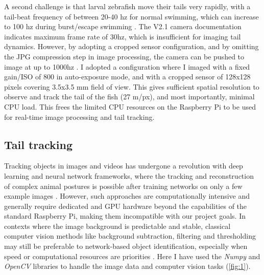 \documentclass[9pt,lineno]{RandlettLab_elife}
\begin{document}
A second challenge is that larval zebrafish move their tails very rapidly, with a tail-beat frequency of between 20-40 hz for normal swimming, which can increase to 100 hz during burst/escape swimming \citep{Budick2000-bq, Muller2004-st, Severi2014-iw}. The V2.1 camera documentation indicates maximum frame rate of 30hz, which is insufficient for imaging tail dynamics. However, by adopting a cropped sensor configuration, and by omitting the JPG compression step in image processing, the camera can be pushed to image at up to 1000hz \citep{660hz}. I adopted a configuration where I imaged with a fixed gain/ISO of 800 in auto-exposure mode, and with a cropped sensor of 128x128 pixels covering 3.5x3.5 mm field of view. This gives sufficient spatial resolution to observe and track the tail of the fish (27 \micro m/px), and most importantly, minimal CPU load. This frees the limited CPU resources on the Raspberry Pi to be used for real-time image processing and tail tracking. 

\subsection{Tail tracking}

Tracking objects in images and videos has undergone a revolution with deep learning and neural network frameworks, where the tracking and reconstruction of complex animal postures is possible after training networks on only a few example images \citep{Mathis2018-rw, Pereira2022-rd}. However, such approaches are computationally intensive and generally require dedicated and GPU hardware beyond the capabilities of the standard Raspberry Pi, making them incompatible with our project goals. In contexts where the image background is predictable and stable, classical computer vision methods like background subtraction, filtering and thresholding may still be preferable to network-based object identification, especially when speed or computational resources are priorities \citep{Mirat2013, Stih2019-gx, Zhu2023}. Here I have used the \emph{Numpy} \citep{harris2020array} and \emph{OpenCV} \citep{opencv_library} libraries to handle the image data and computer vision tasks (\autoref{fig:1}). 
\end{document}
